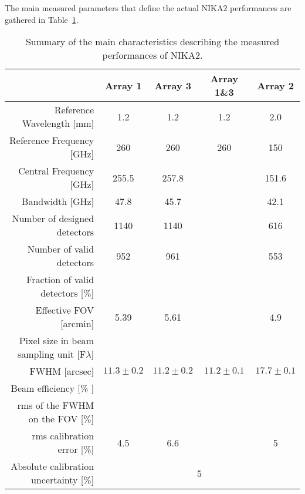 The main measured parameters that define the actual NIKA2 performances are gathered in Table~\ref{nika2summary}.

\begin{table}[h]
  \caption{Summary of the main characteristics describing the measured performances of NIKA2.}
  \label{nika2summary}
  \begin{threeparttable}
    \begin{tabular}{|r|c|c|c|c|}
      \hline
      & Array 1 & Array 3  & Array 1\&3 & Array 2 \\
      \hline
      \hline
      Reference Wavelength  [mm]  &  1.2   &  1.2  & 1.2 & 2.0   \\
      Reference Frequency  [GHz]  &  260   &  260  & 260 & 150  \\
      Central Frequency [GHz]     &  255.5  &    257.8     &     &   151.6  \\
      Bandwidth         [GHz]     &   47.8  &     45.7     &     &    42.1  \\
      \hline
      Number of designed detectors       & 1140      &  1140    &    &    616  \\
      Number of valid detectors          &  952      &   961    &    &    553  \\
      Fraction of valid detectors [$\%$] &           &          &    &         \\
      Effective FOV\tnote{a}\hspace{1mm} [arcmin]    &   5.39    &   5.61    &    &   4.9  \\
      \hline
      Pixel size in beam sampling unit [F$\lambda$]  &    &   &    &   \\
      \hline
      FWHM\tnote{b}\hspace{1mm} [arcsec]  &  $11.3 \pm 0.2$   &  $11.2 \pm 0.2$  &   $11.2 \pm 0.1$  &  $17.7 \pm 0.1$ \\
      Beam efficiency\tnote{c}\hspace{1mm} [\% ]    &        &    &     &    \\
      rms of the FWHM on the FOV [$\%$]   &   &    &   &  \\
      \hline 
      rms calibration error [\%]            & 4.5  & 6.6  &   & 5  \\
      \hline
      Absolute calibration uncertainty [\%] &  \multicolumn{4}{|c|}{5} \\

\end{tabular}
\end{threeparttable}
\end{table}
